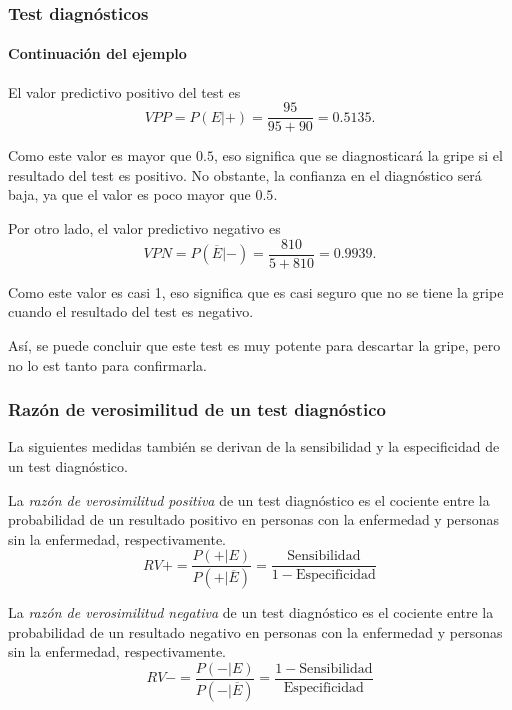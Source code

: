 	
\begin{frame}
\frametitle{Test diagnósticos}
\framesubtitle{Continuación del ejemplo}
El valor predictivo positivo del test es 
\[
	VPP = P(E|+) = \frac{95}{95+90} = 0.5135.
\]
	
Como este valor es mayor que $0.5$, eso significa que se diagnosticará la gripe si el resultado del test es positivo.
No obstante, la confianza en el diagnóstico será baja, ya que el valor es poco mayor que $0.5$.
	
Por otro lado, el valor predictivo negativo es 
\[
	VPN = P(\overline{E}|-) = \frac{810}{5+810} = 0.9939. 
\]
	
Como este valor es casi 1, eso significa que es casi seguro que no se tiene la gripe cuando el resultado del test es negativo.
	
Así, se puede concluir que este test es muy potente para descartar la gripe, pero no lo est tanto para confirmarla.
\end{frame}
	
	
\begin{frame}
\frametitle{Razón de verosimilitud de un test diagnóstico}
La siguientes medidas también se derivan de la sensibilidad y la especificidad de un test diagnóstico.
\begin{definicion}
La \emph{razón de verosimilitud positiva} de un test diagnóstico es el cociente entre la probabilidad de un resultado positivo en personas con la enfermedad y personas sin la enfermedad, respectivamente.
\[
	RV+=\frac{P(+|E)}{P(+|\overline{E})} = \frac{\mbox{Sensibilidad}}{1-\mbox{Especificidad}}
\]
\end{definicion}
	
\begin{definicion}
La \emph{razón de verosimilitud negativa} de un test diagnóstico es el cociente entre la probabilidad de un resultado negativo en personas con la enfermedad y personas sin la enfermedad, respectivamente.
\[
	RV-=\frac{P(-|E)}{P(-|\overline{E})} = \frac{1-\mbox{Sensibilidad}}{\mbox{Especificidad}}
\]
\end{definicion}
\end{frame}
	
